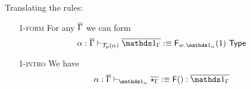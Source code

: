 \documentclass[10pt]{article}
\theoremstyle{definition}
\newcommand{\yields}{\vdash}
\newcommand{\TYPE}{\,\,\mathsf{Type}}
\newcommand\F[2]{\ensuremath{\mathsf{F}_{#1}(#2)}}
\newcommand\FI[1]{\ensuremath{\mathsf{F}{(#1)}}}
\newcommand\El[2]{\mathcal{T}_{#1}(#2)}
\begin{document}
Translating the rules:
\begin{enumerate}[style = multiline, labelwidth = 80pt]
\item[\textsc{1-form}] For any $\overline{\Gamma}$ we can form
\begin{align*}
\alpha : \upstairs{\Gamma} \yields_{\El{p}{\alpha}} \upstairs{\One_\Gamma} :\equiv \F{w.\One_\alpha}{1} \TYPE
\end{align*}

\item[\textsc{1-intro}] We have
\begin{align*}
\alpha : \upstairs{\Gamma} \yields_{\One_\alpha} \upstairs{\star_\Gamma} :\equiv \FI{} : \upstairs{\One_\Gamma}
\end{align*}


\end{enumerate}
\end{document}
